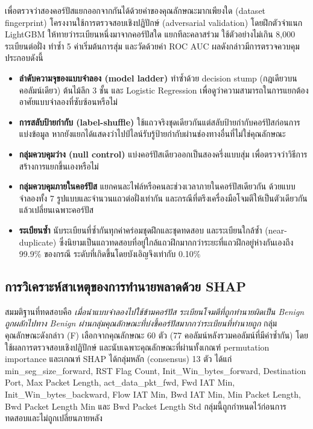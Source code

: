 เพื่อตรวจว่าสองคอร์ปัสแยกออกจากกันได้ด้วยค่าของคุณลักษณะมากเพียงใด (dataset fingerprint) โครงงานใช้การตรวจสอบเชิงปฏิปักษ์ (adversarial validation) โดยฝึกตัวจำแนก LightGBM ให้ทายว่าระเบียนหนึ่งมาจากคอร์ปัสใด แยกทีละคลาสร่วม ใช้ตัวอย่างไม่เกิน 8,000 ระเบียนต่อฝั่ง ทำซ้ำ 5 ค่าเริ่มต้นการสุ่ม และวัดด้วยค่า ROC AUC ผลดังกล่าวมีการตรวจควบคุมประกอบดังนี้

\begin{itemize}
    \item \textbf{ลำดับความจุของแบบจำลอง (model ladder)} ทำซ้ำด้วย decision stump (กฎเดียวบนคอลัมน์เดียว) ต้นไม้ลึก 3 ชั้น และ Logistic Regression เพื่อดูว่าความสามารถในการแยกต้องอาศัยแบบจำลองที่ซับซ้อนหรือไม่
    \item \textbf{การสลับป้ายกำกับ (label-shuffle)} ใช้แถวจริงชุดเดียวกันแต่สลับป้ายกำกับคอร์ปัสก่อนการแบ่งข้อมูล หากยังแยกได้แสดงว่าไปป์ไลน์รับรู้ป้ายกำกับผ่านช่องทางอื่นที่ไม่ใช่คุณลักษณะ
    \item \textbf{กลุ่มควบคุมว่าง (null control)} แบ่งคอร์ปัสเดียวออกเป็นสองครึ่งแบบสุ่ม เพื่อตรวจว่าวิธีการสร้างการแยกขึ้นเองหรือไม่
    \item \textbf{กลุ่มควบคุมภายในคอร์ปัส} แยกคนละไฟล์หรือคนละช่วงเวลาภายในคอร์ปัสเดียวกัน ด้วยแบบจำลองทั้ง 7 รูปแบบและจำนวนแถวต่อฝั่งเท่ากัน และกรณีที่ตรึงเครื่องมือโจมตีให้เป็นตัวเดียวกันแล้วเปลี่ยนเฉพาะคอร์ปัส
    \item \textbf{ระเบียนซ้ำ} นับระเบียนที่ซ้ำกันทุกค่าคร่อมชุดฝึกและชุดทดสอบ และระเบียนใกล้ซ้ำ (near-duplicate) ซึ่งนิยามเป็นแถวทดสอบที่อยู่ใกล้แถวฝึกมากกว่าระยะที่แถวฝึกอยู่ห่างกันเองถึง 99.9\% ของกรณี ระดับที่เกิดขึ้นโดยบังเอิญจึงเท่ากับ 0.10\%
\end{itemize}

\subsection{การวิเคราะห์สาเหตุของการทำนายพลาดด้วย SHAP}
\label{sec:cd-shap-method}

สมมติฐานที่ทดสอบคือ \emph{เมื่อนำแบบจำลองไปใช้ข้ามคอร์ปัส ระเบียนโจมตีที่ถูกทำนายผิดเป็น Benign ถูกผลักไปทาง Benign ผ่านกลุ่มคุณลักษณะที่บ่งชี้คอร์ปัสมากกว่าระเบียนที่ทำนายถูก} กลุ่มคุณลักษณะดังกล่าว (F) เลือกจากคุณลักษณะ 60 ตัว (77 คอลัมน์หลังรวมคอลัมน์ที่มีค่าซ้ำกัน) โดยใช้ผลการตรวจสอบเชิงปฏิปักษ์ และนับเฉพาะคุณลักษณะที่ผ่านทั้งเกณฑ์ permutation importance และเกณฑ์ SHAP ได้กลุ่มหลัก (consensus) 13 ตัว ได้แก่ min\_seg\_size\_forward, RST Flag Count, Init\_Win\_bytes\_forward, Destination Port, Max Packet Length, act\_data\_pkt\_fwd, Fwd IAT Min, Init\_Win\_bytes\_backward, Flow IAT Min, Bwd IAT Min, Min Packet Length, Bwd Packet Length Min และ Bwd Packet Length Std กลุ่มนี้ถูกกำหนดไว้ก่อนการทดสอบและไม่ถูกเปลี่ยนภายหลัง

